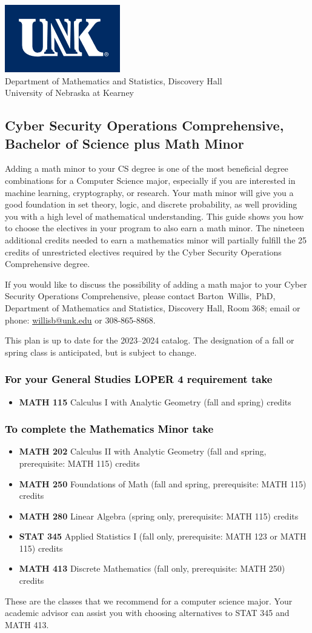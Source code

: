 \documentclass[10pt]{article}
\makeatletter
\newcommand{\calcone}{\textbf{MATH 115} Calculus I with Analytic Geometry (fall and spring) \dotfill 5 credits}
\newcommand{\calctwo}{\textbf{MATH 202} Calculus II with Analytic Geometry (fall and spring, prerequisite: MATH 115) \dotfill 5 credits }
\newcommand{\foundations}{\textbf{MATH 250} Foundations of Math (fall and spring, prerequisite: MATH 115)  \dotfill 3 credits}
\newcommand{\linear}{\textbf{MATH 280} Linear Algebra (spring only, prerequisite: MATH 115) \dotfill 3 credits}
\newcommand{\discrete}{\textbf{MATH 413} Discrete Mathematics  (fall only, prerequisite: MATH 250)\dotfill 3 credits}
\newcommand{\discreteshort}{MATH 413}
\newcommand{\appliedstat}{\textbf{STAT 345} Applied Statistics I (fall only, prerequisite: MATH 123 or MATH 115) \dotfill 3 credits}
\newcommand{\appliedstatshort}{STAT 345}
\newcommand{\contactbw}{\mbox{Barton Willis, PhD}, Department of Mathematics and Statistics,  Discovery Hall, Room 368;
email or phone: \href{mailto:willisb@unk.edu}{willisb@unk.edu} or 308-865-8868.}
\newcommand{\forinfo}[2]{If you would like to discuss the possibility of adding a math {#1} to your {#2}, please contact \contactbw}
\newcommand{\catalog}{2023--2024 }
\newcommand{\LOPER}{LOPER\xspace}
\newcommand{\uptodate}{This plan is up to date for  the \catalog catalog. The designation of a fall or spring class is 
anticipated, but  is subject to change.}
\newcommand{\myheading}{
\begin{flushleft}
\includegraphics[scale=0.35]{unk-logo}\\
\setcounter{footnote}{0}
\vspace{0.25in}
 \textcolor{unkblue}{Department of Mathematics and Statistics, Discovery Hall} \\
  \textcolor{unkblue}{University of Nebraska at Kearney}
\end{flushleft}}
\makeatother
\begin{document}
\vfill 
\newpage



\myheading

\subsection*{\textbf{\textcolor{unkblue}{Cyber Security Operations Comprehensive, Bachelor of Science plus Math Minor}}}

Adding a math minor to your CS degree is one of the most beneficial degree combinations 
for a Computer Science major, especially if you are interested in machine learning, 
cryptography,  or research.  Your math minor will give you a good foundation in 
set theory, logic, and discrete probability, as well providing you with a high level of 
mathematical understanding. This guide shows you how to choose the electives in your program to also 
earn a math minor. The nineteen additional credits needed to earn a mathematics minor 
will partially fulfill the 25 credits of unrestricted electives required by the 
Cyber Security Operations Comprehensive degree.

 
 \forinfo{major}{Cyber Security Operations Comprehensive}

\uptodate
\vspace{-0.1in}

\subsubsection*{\textcolor{black}{For  your General Studies \LOPER 4 requirement take}}
\begin{itemize}
\item  \calcone
\end{itemize}

\subsubsection*{\textcolor{black}{To complete the Mathematics Minor take}}

\begin{itemize}
\item \calctwo
\item \foundations
\item \linear
\item \appliedstat
\item \discrete
\end{itemize}
These are the classes that we recommend for a computer science major.
Your academic advisor can assist you with choosing alternatives 
to \appliedstatshort{} and \discreteshort{}.
\end{document}
